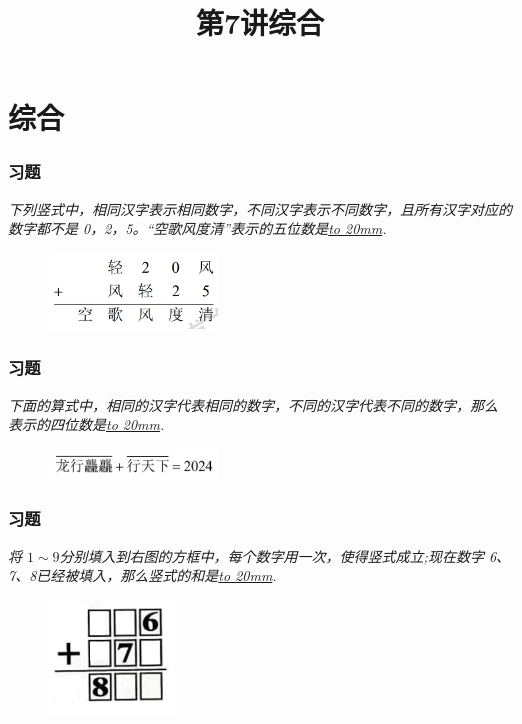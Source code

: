 \section{综合}

\title[第7讲\quad 综合]{第7讲\quad 综合} 
\author{}
\date{}

\begin{frame}
    \titlepage
\end{frame}

\setcounter{framecounter}{0}

\begin{frame}
    \frametitle{习题\theframecounter}
    \vspace*{-1cm}
    \textit{下列竖式中，相同汉字表示相同数字，不同汉字表示不同数字，且所有汉字对应的数字都不是 0，2，5。“空歌风度清”表示的五位数是\underline{\hbox to 20mm{}}.}
    \begin{figure}[H] 
        \centering
        \includegraphics[width=0.4\textwidth]{./pics/Chapter_7/1.png}
    \end{figure}
\end{frame}

\begin{frame}
    \frametitle{习题\theframecounter}
    \vspace*{-1cm}
    \textit{下面的算式中，相同的汉字代表相同的数字，不同的汉字代表不同的数字，那么  表示的四位数是\underline{\hbox to 20mm{}}.}
    \begin{figure}[H] 
        \centering
        \includegraphics[width=0.4\textwidth]{./pics/Chapter_7/2.png}
    \end{figure}
\end{frame}

\begin{frame}
    \frametitle{习题\theframecounter}
    \textit{将 $1\sim 9$分别填入到右图的方框中，每个数字用一次，使得竖式成立;现在数字 6、7、8已经被填入，那么竖式的和是\underline{\hbox to 20mm{}}.}
    \begin{figure}[H] 
        \centering
        \includegraphics[width=0.3\textwidth]{./pics/Chapter_7/3.png}
    \end{figure}
\end{frame}

